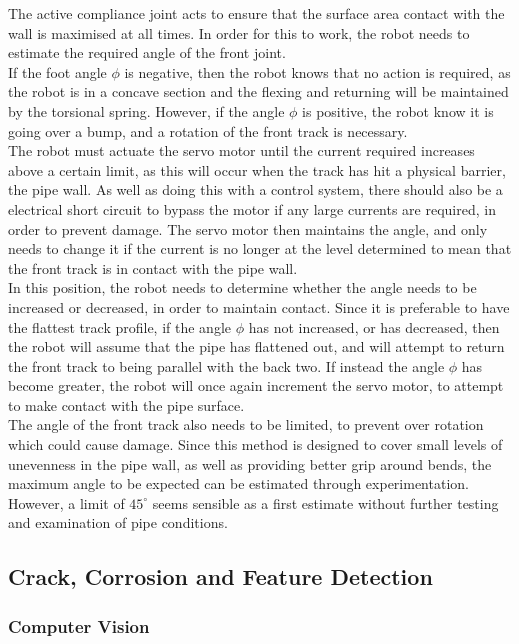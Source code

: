\documentclass[11pt]{article}		%
\begin{document}
		The active compliance joint acts to ensure that the surface area contact with the wall is maximised at all times.
		In order for this to work, the robot needs to estimate the required angle of the front joint.
		\\
		If the foot angle $\phi$ is negative, then the robot knows that no action is required, as the robot is in a concave section and the flexing and returning will be maintained by the torsional spring.
		However, if the angle $\phi$ is positive, the robot know it is going over a bump, and a rotation of the front track is necessary.
		\\
		The robot must actuate the servo motor until the current required increases above a certain limit, as this will occur when the track has hit a physical barrier, the pipe wall.
		As well as doing this with a control system, there should also be a electrical short circuit to bypass the motor if any large currents are required, in order to prevent damage.
		The servo motor then maintains the angle, and only needs to change it if the current is no longer at the level determined to mean that the front track is in contact with the pipe wall.
		\\
		In this position, the robot needs to determine whether the angle needs to be increased or decreased, in order to maintain contact.
		Since it is preferable to have the flattest track profile, if the angle $\phi$ has not increased, or has decreased, then the robot will assume that the pipe has flattened out, and will attempt to return the front track to being parallel with the back two.
		If instead the angle $\phi$ has become greater, the robot will once again increment the servo motor, to attempt to make contact with the pipe surface.
		\\
		The angle of the front track also needs to be limited, to prevent over rotation which could cause damage.
		Since this method is designed to cover small levels of unevenness in the pipe wall, as well as providing better grip around bends, the maximum angle to be expected can be estimated through experimentation.
		However, a limit of $45^\circ$ seems sensible as a first estimate without further testing and examination of pipe conditions.
				
		\subsection{Crack, Corrosion and Feature Detection}
		
		\subsubsection{Computer Vision}
		
\end{document}
